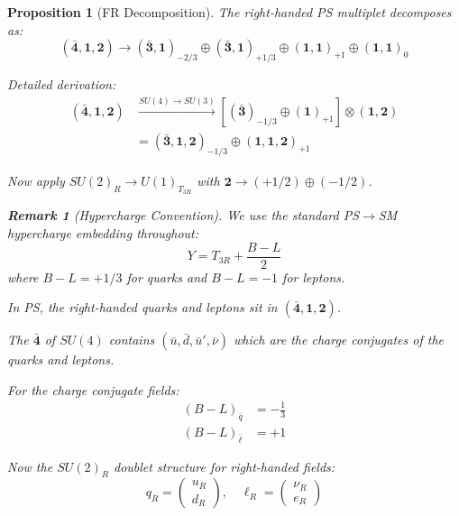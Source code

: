 \documentclass[11pt,a4paper]{article}
\newtheorem{proposition}[theorem]{Proposition}
\newtheorem{remark}[theorem]{Remark}
\begin{document}
\begin{proposition}[FR Decomposition]
\label{prop:FR-decomp}
The right-handed PS multiplet decomposes as:
\begin{equation}
\label{eq:FR-decomp}
(\bar{\mathbf{4}}, \mathbf{1}, \mathbf{2}) \to (\bar{\mathbf{3}}, \mathbf{1})_{-2/3} \oplus (\bar{\mathbf{3}}, \mathbf{1})_{+1/3} \oplus (\mathbf{1}, \mathbf{1})_{+1} \oplus (\mathbf{1}, \mathbf{1})_{0}
\end{equation}

Detailed derivation:
\begin{align}
\label{eq:FR-step1}
(\bar{\mathbf{4}}, \mathbf{1}, \mathbf{2}) &\xrightarrow{SU(4)\to SU(3)} [(\bar{\mathbf{3}})_{-1/3} \oplus (\mathbf{1})_{+1}] \otimes (\mathbf{1}, \mathbf{2}) \\
\label{eq:FR-step2}
&= (\bar{\mathbf{3}}, \mathbf{1}, \mathbf{2})_{-1/3} \oplus (\mathbf{1}, \mathbf{1}, \mathbf{2})_{+1}
\end{align}

Now apply $SU(2)_R \to U(1)_{T_{3R}}$ with $\mathbf{2} \to (+1/2) \oplus (-1/2)$.

\begin{remark}[Hypercharge Convention]
We use the standard PS$\to$SM hypercharge embedding throughout:
\begin{equation}
\label{eq:Y-convention-remind}
Y = T_{3R} + \frac{B-L}{2}
\end{equation}
where $B-L = +1/3$ for quarks and $B-L = -1$ for leptons.
\end{remark}

In PS, the right-handed quarks and leptons sit in $(\bar{\mathbf{4}}, \mathbf{1}, \mathbf{2})$.

The $\bar{\mathbf{4}}$ of $SU(4)$ contains $(\bar{u}, \bar{d}, \bar{u}', \bar{\nu})$ which are the \textit{charge conjugates} of the quarks and leptons.

For the charge conjugate fields:
\begin{align}
\label{eq:BL-antiquark}
(B-L)_{\bar{q}} &= -\frac{1}{3} \\
\label{eq:BL-antilepton}
(B-L)_{\bar{\ell}} &= +1
\end{align}

Now the $SU(2)_R$ doublet structure for right-handed fields:
\begin{equation}
\label{eq:qR-doublet}
q_R = \begin{pmatrix} u_R \\ d_R \end{pmatrix}, \quad
\ell_R = \begin{pmatrix} \nu_R \\ e_R \end{pmatrix}
\end{equation}


\end{proposition}
\end{document}
